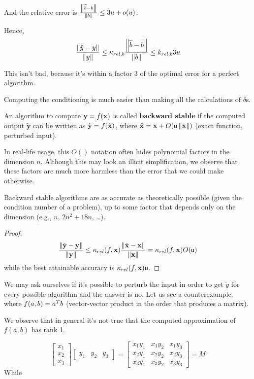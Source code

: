 \documentclass[computational_mathematics.tex]{subfiles}
\begin{document}
And the relative error is $\frac{\left\lVert\widetilde{b}-b\right\rVert}{\left\lVert b\right\rVert} \leq 3u + o(u)$.

Hence,
\[
  \frac{\left\lVert\tilde{y}-y\right\rVert}{\left\lVert y\right\rVert} \leq \kappa_{rel, b} \frac{\left\lVert\widetilde{b}-b\right\rVert}{\left\lVert b\right\rVert} \le k_{rel, b} 3u
\]

This isn't bad, because it's within a factor $3$ of the optimal error for a perfect algorithm.

Computing the conditioning is much easier than making all the calculations of $\delta$s.

\begin{definition}
  An algorithm to compute $\mathbf{y}=f(\mathbf{x})$ is called \textbf{backward stable} if the computed output $\tilde{\mathbf{y}}$ can be written as $\tilde{\mathbf{y}} = f(\tilde{\mathbf{x}})$, where $\tilde{\mathbf{x}} = \mathbf{x} + O(\mathsf{u} \left\lVert\mathbf{x}\right\rVert)$ (exact function, perturbed input).
\end{definition}

\begin{obs}
In real-life usage, this $O()$ notation often hides polynomial factors in the dimension $n$. Although this may look an illicit simplification, we observe that these factors are much more harmless than the error that we could make otherwise.
\end{obs}

\begin{theorem}
Backward stable algorithms are as accurate as theoretically possible (given the condition number of a problem), up to some factor that depends only on the dimension (e.g., $n$, $2n^2+18n$, \dots).
\end{theorem}

\begin{proof}
\[
\frac{\left\lVert\tilde{\mathbf{y}} - \mathbf{y}\right\rVert}{\left\lVert\mathbf{y}\right\rVert} \leq \kappa_{rel}(f,\mathbf{x})\frac{\left\lVert\tilde{\mathbf{x}}-\mathbf{x}\right\rVert}{\left\lVert\mathbf{x}\right\rVert} = \kappa_{rel}(f,\mathbf{x}) O(\mathsf{u})
\]
while the best attainable accuracy is $\kappa_{rel}(f,\mathbf{x})\mathsf{u}$.
\end{proof}


We may ask ourselves if it's possible to perturb the input in order to get $\widetilde{y}$ for every possible algorithm and the answer is no. Let us see a counterexample, where $f(a, b) = {a}^{T} b$ (vector-vector product in the order that produces a matrix).

We observe that in general it's not true that the computed approximation of $f(a, b)$ has rank 1.

\[
\begin{bmatrix}
    x_1\\ x_2\\ x_3
\end{bmatrix}
\begin{bmatrix}
    y_1 & y_2 & y_3
\end{bmatrix}
=
\begin{bmatrix}
    x_1 y_1 & x_1 y_2 & x_1 y_3\\
    x_2 y_1 & x_2 y_2 & x_2 y_3\\
    x_3 y_1 & x_3 y_2 & x_3 y_3
\end{bmatrix}
=
M
\]
While
\end{document}
